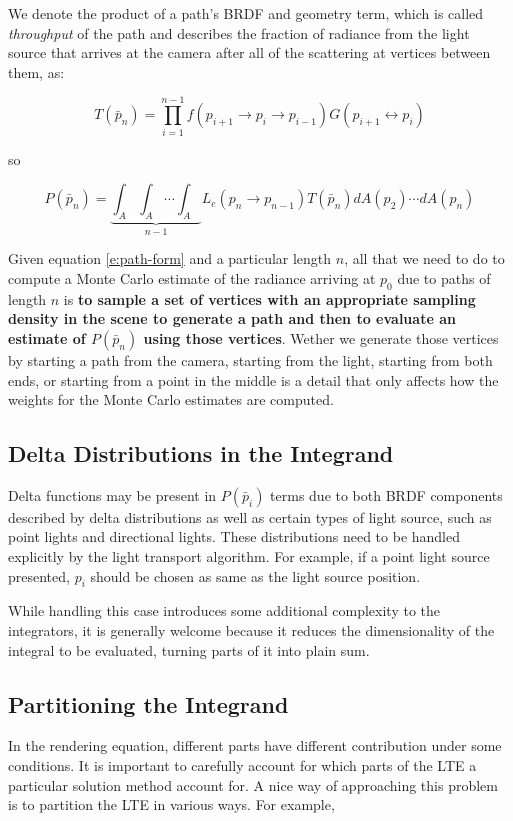 We denote the product of a path's BRDF and geometry term, which is called \textit{throughput} of the path and describes the fraction of radiance from the light source that arrives at the camera after all of the scattering at vertices between them, as:

\begin{equation*}
	T(\bar{p}_n)=\prod_{i=1}^{n-1}f(p_{i+1}\to p_i\to p_{i-1})G(p_{i+1}\leftrightarrow p_i)
\end{equation*}

so

\begin{equation*}
	P(\bar{p}_n)=\underbrace{\int_A\int_A \cdots\int_A}_{n-1}L_e(p_n\to p_{n-1})T(\bar{p}_n) dA(p_2)\cdots dA(p_n)
\end{equation*} 

Given equation \ref{e:path-form} and a particular length $n$, all that we need to do to compute a Monte Carlo estimate of the radiance arriving at $p_0$ due to paths of length $n$ is \textbf{to sample a set of vertices with an appropriate sampling density in the scene to generate a path and then to evaluate an estimate of $P(\bar{p}_n)$ using those vertices}. Wether we generate those vertices by starting a path from the camera, starting from the light, starting from both ends, or starting from a point in the middle is a detail that only affects how the weights for the Monte Carlo estimates are computed.

   
\subsection{Delta Distributions in the Integrand}
Delta functions may be present in $P(\bar{p}_i)$ terms due to both BRDF components described by delta distributions as well as certain types of light source, such as point lights and directional lights. These distributions need to be handled explicitly by the light transport algorithm. For example, if a point light source presented, $p_i$ should be chosen as same as the light source position.

While handling this case introduces some additional complexity to the integrators, it is generally welcome because it reduces the dimensionality of the integral to be evaluated, turning parts of it into plain sum.


\subsection{Partitioning the Integrand}
In the rendering equation, different parts have different contribution under some conditions. It is important to carefully account for which parts of the LTE a particular solution method account for. A nice way of approaching this problem is to partition the LTE in various ways. For example, 

